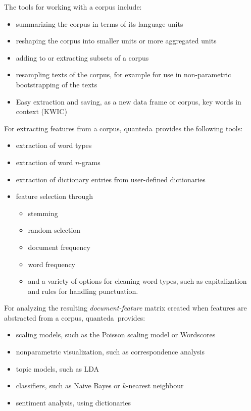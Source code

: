 \documentclass[11pt]{article}\usepackage[]{graphicx}\usepackage[]{color}
\newcommand{\quanteda}{\textsf{quanteda}\ }
\begin{document}
The tools for working with a corpus include:
\begin{itemize}
\item summarizing the corpus in terms of its language units
\item reshaping the corpus into smaller units or more aggregated units
\item adding to or extracting subsets of a corpus
\item resampling texts of the corpus, for example for use in
  non-parametric bootstrapping of the texts \citep[for an example, see][]{lowebenoitPA2013}
  \item Easy extraction and saving, as a new data frame or corpus, key
    words in context (KWIC)
\end{itemize}

For extracting features from a corpus, \quanteda provides the following tools:
\begin{itemize}
\item extraction of word types
\item extraction of word $n$-grams
\item extraction of dictionary entries from user-defined dictionaries
\item feature selection through
  \begin{itemize}
  \item stemming
  \item random selection
  \item document frequency
  \item word frequency
  \item and a variety of options for cleaning word types, such as
    capitalization and rules for handling punctuation.
  \end{itemize}
\end{itemize}

For analyzing the resulting \emph{document-feature} matrix created
when features are abstracted from a corpus, \quanteda provides:
\begin{itemize}
\item scaling models, such as the Poisson scaling model or Wordscores
\item nonparametric visualization, such as correspondence analysis
\item topic models, such as LDA
\item classifiers, such as Naive Bayes or $k$-nearest neighbour
\item sentiment analysis, using dictionaries
\end{itemize}
\end{document}
